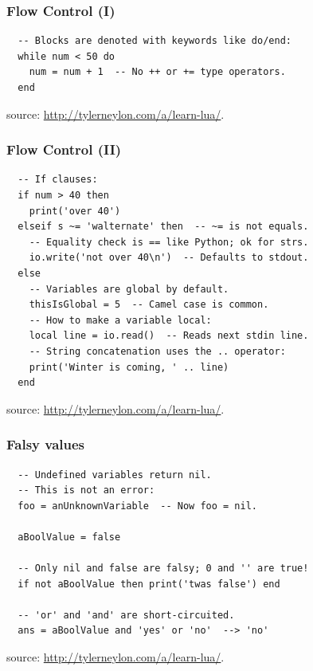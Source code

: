 \begin{frame}[fragile]
  \frametitle{Flow Control (I)}
  \begin{verbatim}
  -- Blocks are denoted with keywords like do/end:
  while num < 50 do
    num = num + 1  -- No ++ or += type operators.
  end
  \end{verbatim}
  \begin{center}
    \begin{tiny}
      source: \url{http://tylerneylon.com/a/learn-lua/}.
    \end{tiny}
  \end{center}
\end{frame}

\begin{frame}[fragile]
  \frametitle{Flow Control (II)}
  \begin{verbatim}
  -- If clauses:
  if num > 40 then
    print('over 40')
  elseif s ~= 'walternate' then  -- ~= is not equals.
    -- Equality check is == like Python; ok for strs.
    io.write('not over 40\n')  -- Defaults to stdout.
  else
    -- Variables are global by default.
    thisIsGlobal = 5  -- Camel case is common.
    -- How to make a variable local:
    local line = io.read()  -- Reads next stdin line.
    -- String concatenation uses the .. operator:
    print('Winter is coming, ' .. line)
  end
  \end{verbatim}
  \begin{center}
    \begin{tiny}
      source: \url{http://tylerneylon.com/a/learn-lua/}.
    \end{tiny}
  \end{center}
\end{frame}

\begin{frame}[fragile]
  \frametitle{Falsy values}
  \begin{verbatim}
  -- Undefined variables return nil.
  -- This is not an error:
  foo = anUnknownVariable  -- Now foo = nil.

  aBoolValue = false

  -- Only nil and false are falsy; 0 and '' are true!
  if not aBoolValue then print('twas false') end

  -- 'or' and 'and' are short-circuited.
  ans = aBoolValue and 'yes' or 'no'  --> 'no'
  \end{verbatim}
  \begin{center}
    \begin{tiny}
      source: \url{http://tylerneylon.com/a/learn-lua/}.
    \end{tiny}
  \end{center}
\end{frame}

